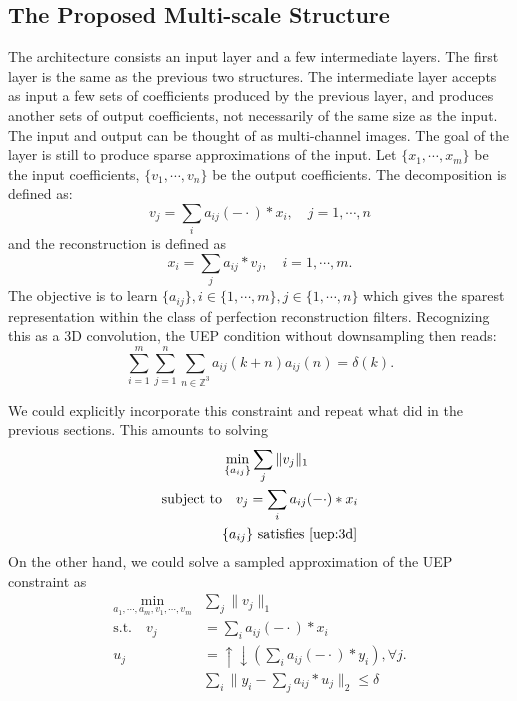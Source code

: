 \documentclass[a4paper]{article}
\begin{document}
\subsection{The Proposed Multi-scale Structure}
The architecture consists an input layer and a few intermediate layers. The first layer is the same as the previous two structures. The intermediate layer accepts as input a few sets of coefficients produced by the previous layer, and produces another sets of output coefficients, not necessarily of the same size as the input. The input and output can be thought of as multi-channel images. The goal of the layer is still to produce sparse approximations of the input. Let $\{x_1,\cdots,x_m\}$ be the input coefficients, $\{v_1,\cdots,v_n\}$ be the output coefficients. The decomposition is defined as:
\begin{equation}
v_j = \sum_i a_{ij}(-\cdot)*x_i,\quad j=1,\cdots,n
\end{equation}
and the reconstruction is defined as 
\begin{equation}
x_i = \sum_j a_{ij}*v_j, \quad i=1,\cdots, m.
\end{equation}
The objective is to learn $\{a_{ij}\}, i\in \{1,\cdots,m\}, j\in \{1,\cdots, n\}$ which gives the sparest representation within the class of perfection reconstruction filters. Recognizing this as a 3D convolution, the UEP condition without downsampling then reads:
\begin{equation}
\label{uep:3d}
\sum_{i=1}^m\sum_{j=1}^n  \sum_{n\in \mathbb{Z}^3} a_{ij}(k+n)a_{ij}(n) = \delta(k).
\end{equation}

We could explicitly incorporate this constraint and repeat what did in the previous sections. This amounts to solving
\begin{equation}
\begin{aligned}
	&\min_{ \{a_{ij}\} } \sum_j \|v_j\|_1 \\
	\textrm{subject to} &\quad v_j = \sum_i a_{ij}(-\cdot)*x_i \\
		&\{a_{ij}\} \textrm{ satisfies \eqref{uep:3d}} \\
\end{aligned}
\end{equation}
On the other hand, we could solve a sampled approximation of the UEP constraint as
\begin{equation}
\label{eq:m3}
\begin{aligned}
\min_{a_1,\cdots,a_m, v_1,\cdots,v_m}& \sum_j \|v_j\|_1 \\
 \textrm{s.t.}  \quad v_j& = \sum_{i} a_{ij}(-\cdot)*x_i \\
	u_j&=\uparrow\downarrow(\sum_i a_{ij}(-\cdot)*y_i), \forall j. \\
	&\sum_i \|y_i - \sum_j a_{ij}*u_j\|_2 \leq \delta 
\end{aligned}
\end{equation}
\end{document}
